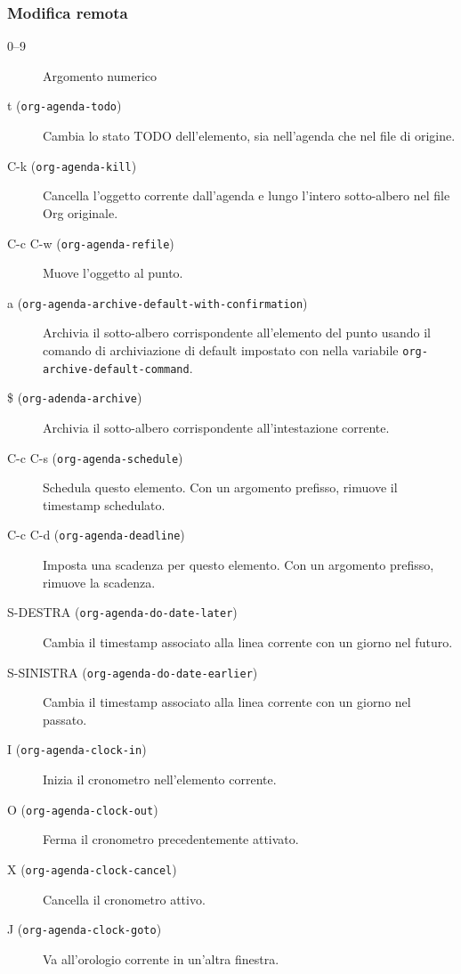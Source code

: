 \documentclass[11pt]{article}
\begin{document}
\subsubsection*{Modifica remota}
\label{sec:org31165a0}
\begin{description}
\item[{0--9}] Argomento numerico

\item[{t (\texttt{org-agenda-todo})}] Cambia lo stato TODO dell'elemento, sia nell'agenda che nel file di
origine.

\item[{C-k (\texttt{org-agenda-kill})}] Cancella l'oggetto corrente dall'agenda e lungo l'intero sotto-albero
nel file Org originale.

\item[{C-c C-w (\texttt{org-agenda-refile})}] Muove l'oggetto al punto.

\item[{a (\texttt{org-agenda-archive-default-with-confirmation})}] Archivia il sotto-albero corrispondente all'elemento del punto usando
il comando di archiviazione di default impostato con nella variabile
\texttt{org-archive-default-command}.

\item[{\$ (\texttt{org-adenda-archive})}] Archivia il sotto-albero corrispondente all'intestazione corrente.

\item[{C-c C-s (\texttt{org-agenda-schedule})}] Schedula questo elemento. Con un argomento prefisso, rimuove il
timestamp schedulato.

\item[{C-c C-d (\texttt{org-agenda-deadline})}] Imposta una scadenza per questo elemento. Con un argomento prefisso,
rimuove la scadenza.

\item[{S-DESTRA (\texttt{org-agenda-do-date-later})}] Cambia il timestamp associato alla linea corrente con un giorno nel
futuro.

\item[{S-SINISTRA (\texttt{org-agenda-do-date-earlier})}] Cambia il timestamp associato alla linea corrente con un giorno nel
passato.

\item[{I (\texttt{org-agenda-clock-in})}] Inizia il cronometro nell'elemento corrente.

\item[{O (\texttt{org-agenda-clock-out})}] Ferma il cronometro precedentemente attivato.

\item[{X (\texttt{org-agenda-clock-cancel})}] Cancella il cronometro attivo.

\item[{J (\texttt{org-agenda-clock-goto})}] Va all'orologio corrente in un'altra finestra.
\end{description}
\end{document}
